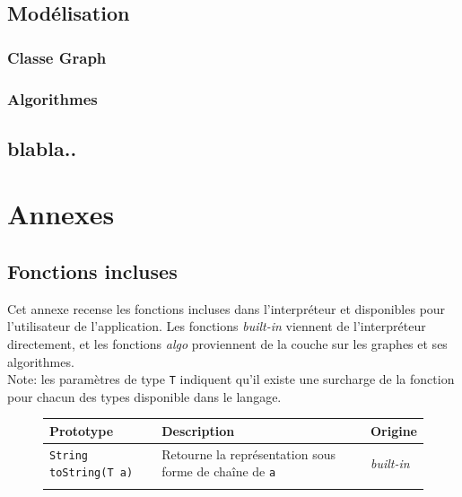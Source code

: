 \documentclass[french]{article}
\begin{document}
		
		\subsection{Modélisation}
			\subsubsection{Classe Graph}
			\subsubsection{Algorithmes}
		\subsection{blabla..}
	
	\section{Annexes}
	
		\subsection{Fonctions incluses}
			\label{subsec:annexes-fonctions-incluses}
			Cet annexe recense les fonctions incluses dans l'interpréteur et disponibles pour l'utilisateur de l'application. Les fonctions \textit{built-in} viennent de l'interpréteur directement, et les fonctions \textit{algo} proviennent de la couche sur les graphes et ses algorithmes.\\
			
			Note: les paramètres de type \texttt{T} indiquent qu'il existe une surcharge de la fonction pour chacun des types disponible dans le langage.
			
			\begin{figure}[H]
				\centering
				\begin{tabular}{lll}
					Prototype & Description & Origine\\
					\hline
					\texttt{String toString(T a)} & Retourne la représentation sous forme de chaîne de \texttt{a} & \textit{built-in}\\
					\texttt{} & & \textit{}\\
				\end{tabular}
			\end{figure}
	
\end{document}
